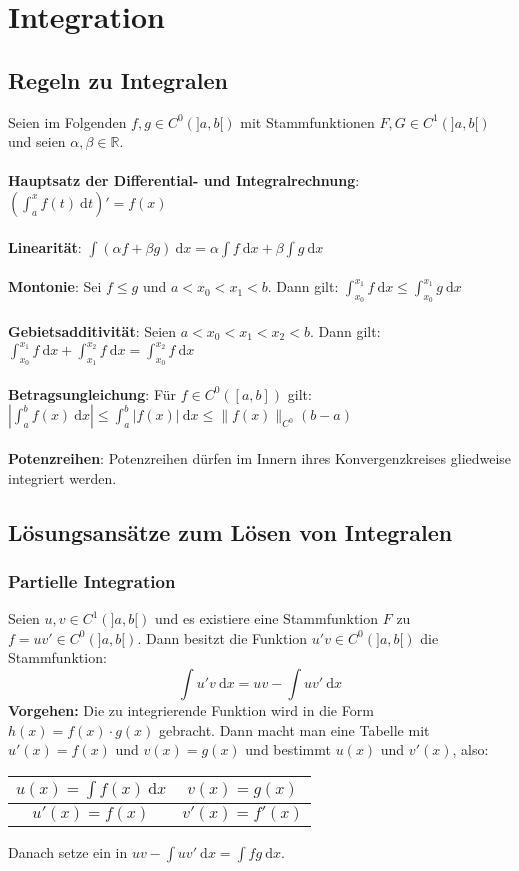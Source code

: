 \documentclass[a4paper,10pt]{scrartcl}
\newcommand{\diff}{\ \mathrm{d}}
\begin{document}
\section{Integration}
\subsection{Regeln zu Integralen}
Seien im Folgenden $f,g\in C^0(]a,b[)$ mit Stammfunktionen $F,G\in C^1(]a,b[)$ und seien $\alpha,\beta\in\mathbb{R}$. \\\\
\textbf{Hauptsatz der Differential- und Integralrechnung}: $\displaystyle \left(\int_{a}^{x} f(t)\diff t\right)' = f(x)$\\\\
\textbf{Linearität}: $\displaystyle \int (\alpha f + \beta g) \diff x= \alpha \int f\diff x + \beta \int g\diff x$\\\\
\textbf{Montonie}: Sei $f\leq g$ und $a<x_0<x_1<b$. Dann gilt: $\displaystyle \int_{x_0}^{x_1}f\diff x \leq \int_{x_0}^{x_1}g\diff x$\\\\
\textbf{Gebietsadditivität}: Seien $a<x_0<x_1<x_2<b$. Dann gilt: 
$\displaystyle \int_{x_0}^{x_1} f\diff x+ \int_{x_1}^{x_2} f \diff x = \int_{x_0}^{x_2}f \diff x$\\\\
\textbf{Betragsungleichung}: Für $f\in C^0([a,b])$ gilt: $\displaystyle \left| \int_{a}^{b} f(x)\diff x \right| \leq \int_{a}^{b} |f(x)| \diff x \leq \|f(x)\|_{C^0}(b-a)$ \\\\
\textbf{Potenzreihen}: Potenzreihen dürfen im Innern ihres Konvergenzkreises gliedweise integriert werden.
\subsection{Lösungsansätze zum Lösen von Integralen}
\subsubsection{Partielle Integration}
Seien $u,v\in C^1(]a,b[)$ und es existiere eine Stammfunktion $F$ zu $f=uv'\in C^0(]a,b[)$. Dann besitzt die Funktion $u'v\in C^0(]a,b[)$ die Stammfunktion: 
\begin{equation}
	\int u'v \diff x = uv-\int uv' \diff x
\end{equation}
\textbf{Vorgehen:} Die zu integrierende Funktion wird in die Form $h(x)=f(x)\cdot g(x)$ gebracht. Dann macht man eine Tabelle mit $u'(x)=f(x)$ und $v(x)=g(x)$ und bestimmt $u(x)$ und $v'(x)$, also:
\begin{center}
	\begin{tabular}{|c|c|}
		\hline
		$u(x)= \int f(x)\diff x$ & $v(x)= g(x)$\\
		\hline
		$u'(x)=f(x)$ & $v'(x) = f'(x)$\\
		\hline
	\end{tabular}
\end{center}
Danach setze ein in $uv - \int uv'\diff x = \int fg\diff x$.
\end{document}
